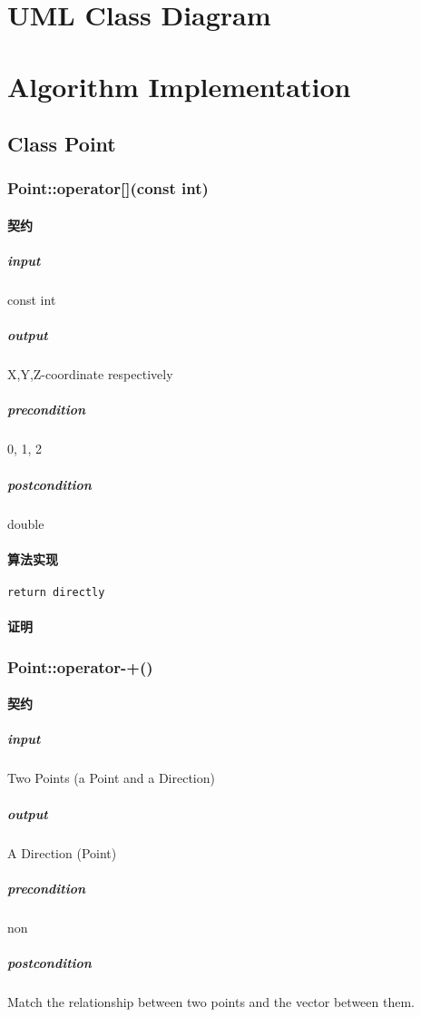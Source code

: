 \documentclass[a4paper]{book}
\numberwithin{equation}{chapter}
\theoremstyle{definition}
\begin{document}
\begin{multicols}{2}
\begin{itemize}
\end{itemize}




%

\section{UML Class Diagram}
%

\section{Algorithm Implementation}
%
\subsection{Class Point}


\subsubsection{Point::operator[](const int)}
\paragraph{契约}
\subparagraph{input}
const int
\subparagraph{output}
X,Y,Z-coordinate respectively
\subparagraph{precondition}
0, 1, 2
\subparagraph{postcondition}
double
\paragraph{算法实现}
\begin{lstlisting}
return directly
\end{lstlisting}
\paragraph{证明}


\subsubsection{Point::operator-+()}
\paragraph{契约}
\subparagraph{input}
Two Points (a Point and a Direction)
\subparagraph{output}
A Direction (Point)
\subparagraph{precondition}
non
\subparagraph{postcondition}
Match the relationship between two points and the vector between them.


\end{multicols}
\end{document}
